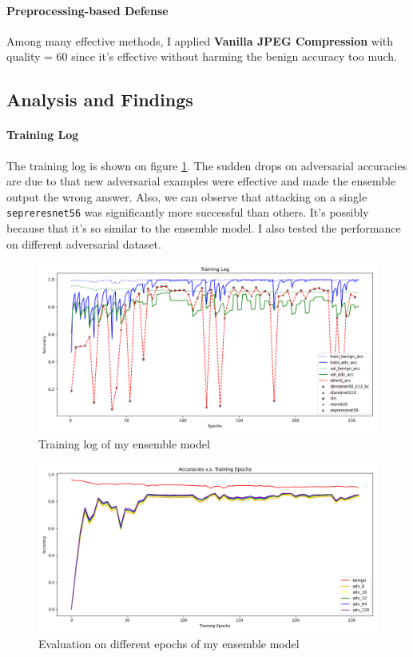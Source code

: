 \documentclass{article}
\begin{document}
\paragraph{Preprocessing-based Defense} Among many effective methods, I applied
\textbf{Vanilla JPEG Compression} with quality = 60 since it's effective without harming the
benign accuracy too much.

\subsection{Analysis and Findings}

\paragraph{Training Log} The training log is shown on figure \ref{img:final-training-log}. The
sudden drops on adversarial accuracies are due to that new adversarial examples were effective and
made the ensemble output the wrong answer. Also, we can observe that attacking on a single
\texttt{sepreresnet56} was significantly more successful than others. It's possibly because that
it's so similar to the ensemble model. I also tested the performance on different adversarial
dataset.

\begin{figure}[ht]
  \centering
  \includegraphics[width=0.8\linewidth]{imgs/final-training-log.png}
  \caption{Training log of my ensemble model}
  \label{img:final-training-log}
\end{figure}

\begin{figure}[ht]
  \centering
  \includegraphics[width=0.8\linewidth]{imgs/final-evaluation.png}
  \caption{Evaluation on different epochs of my ensemble model}
  \label{img:final-evalution}
\end{figure}
\end{document}
